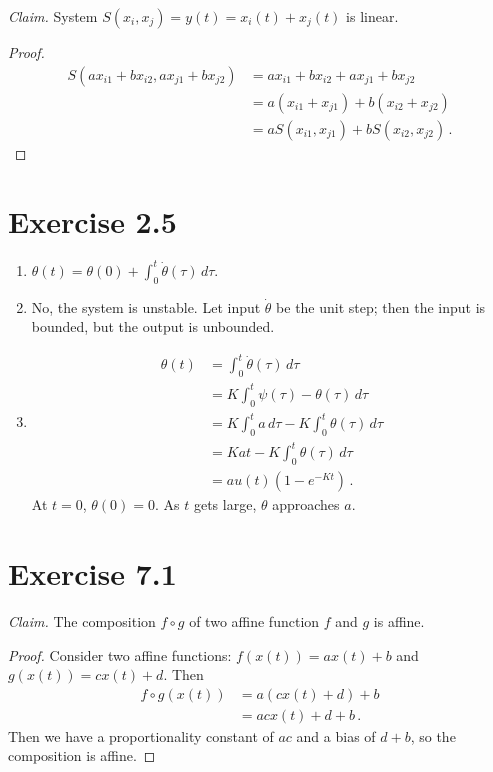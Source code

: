 \documentclass{abrice}
\begin{document}
\begin{enumerate}[label= (\alph*)]
  \textit{Claim.} System $S(x_i,x_j) = y(t) = x_i(t) + x_j(t)$ is linear.

  \begin{proof}
    \begin{align*}
      S(ax_{i1} + bx_{i2}, ax_{j1} + bx_{j2})
      &= ax_{i1} + bx_{i2} + ax_{j1} + bx_{j2} \\
      &= a(x_{i1} + x_{j1}) + b(x_{i2} + x_{j2}) \\
      &= aS(x_{i1},x_{j1}) + bS(x_{i2},x_{j2})\, .
    \end{align*}
  \end{proof}
\end{enumerate}

\section{Exercise 2.5}

\begin{enumerate}[label= (\alph*)]
\item $\theta(t) = \theta(0) + \int_0^t \dot{\theta}(\tau)\, d\tau$.
\item No, the system is unstable. Let input $\dot{\theta}$ be the unit step;
  then the input is bounded, but the output is unbounded.
\item
  \begin{align*}
    \theta(t)
    &= \int_0^t \dot\theta (\tau)\, d\tau \\
    &= K \int_0^t \psi(\tau) - \theta(\tau)\, d\tau \\
    &= K \int_0^t a\, d\tau - K \int_0^t \theta(\tau)\, d\tau \\
    &= Kat - K \int_0^t \theta(\tau)\, d\tau \\
    &= au(t)(1 - e^{-Kt})\, .
  \end{align*}
  At $t = 0$, $\theta(0) = 0$. As $t$ gets large, $\theta$ approaches $a$.
\end{enumerate}

\section{Exercise 7.1}

\textit{Claim.} The composition $f \circ g$ of two affine function $f$ and $g$
is affine.

\begin{proof}
  Consider two affine functions: $f(x(t)) = ax(t) + b$ and
  $g(x(t)) = cx(t) + d$. Then
  \begin{align*}
    f \circ g (x(t))
    &= a(cx(t) + d) + b \\
    &= acx(t) + d + b\, .
  \end{align*}
  Then we have a proportionality constant of $ac$ and a bias of $d + b$, so the
  composition is affine.
\end{proof}
\end{document}
